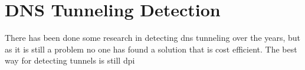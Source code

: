 \chapter{DNS Tunneling Detection}
\label{chp:dns_detection}

There has been done some research in detecting \Gls{dns} tunneling over the years, but as it is still a problem no one has found a solution that is cost efficient. The best way for detecting tunnels is still \Gls{dpi}